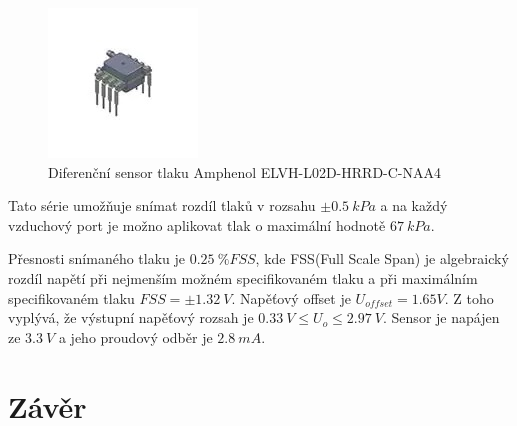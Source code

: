 \documentclass{ctuthesis}
\begin{document}
\begin{figure}[H]
    \centering
    \includegraphics{pictures/amphenol.jpg}
    \caption{Diferenční sensor tlaku Amphenol ELVH-L02D-HRRD-C-NAA4}
    \label{fig:amphenol}
\end{figure}
Tato série umožňuje snímat rozdíl tlaků v rozsahu $\pm 0.5 \ kPa$ a na každý vzduchový port je možno aplikovat tlak o maximální hodnotě $67 \ kPa$. \par 
Přesnosti snímaného tlaku je  $0.25 \ \% FSS$, kde FSS(Full Scale Span) je algebraický rozdíl napětí při nejmenším možném specifikovaném tlaku a při maximálním specifikovaném tlaku $FSS = \pm 1.32 \ V $. Napěťový offset je $U_{offset} = 1.65 V$. Z toho vyplývá, že výstupní napěťový rozsah je $0.33 \ V \leq U_o \leq 2.97 \ V$. 
Sensor je napájen ze $3.3 \ V $ a jeho proudový odběr je $2.8 \ mA $.






\chapter{Závěr}

\appendix




%

\end{document}
